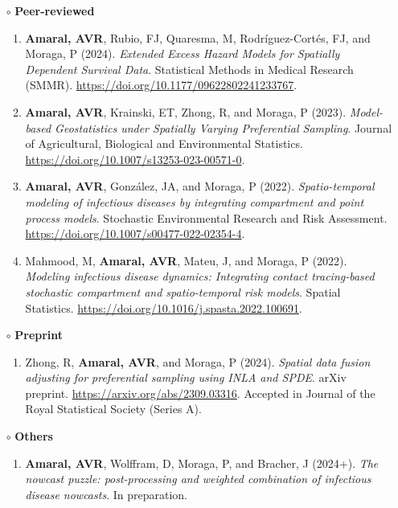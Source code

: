 \documentclass[10pt, ]{article}
\begin{document}
	\begin{itemize}[noitemsep, topsep=0pt]
		\item[$\circ$]  \textbf{Peer-reviewed}
		\begin{enumerate}[label*=\arabic*., noitemsep]
		\item  \textbf{Amaral, AVR}, Rubio, FJ, Quaresma, M, Rodríguez-Cortés, FJ, and Moraga, P (2024). \textit{Extended Excess Hazard Models for Spatially Dependent Survival Data}. Statistical Methods in Medical Research (SMMR). \href{https://doi.org/10.1177/09622802241233767}{\url{https://doi.org/10.1177/09622802241233767}}.
		\item  \textbf{Amaral, AVR}, Krainski, ET, Zhong, R, and Moraga, P (2023). \textit{Model-based Geostatistics under Spatially Varying Preferential Sampling}.  Journal of Agricultural, Biological and Environmental Statistics. \url{https://doi.org/10.1007/s13253-023-00571-0}.
		\item  \textbf{Amaral, AVR}, González, JA, and Moraga, P (2022). \textit{Spatio-temporal modeling of infectious diseases by integrating compartment and point process models}. Stochastic Environmental Research and Risk Assessment. \url{https://doi.org/10.1007/s00477-022-02354-4}.
		\item  Mahmood, M, \textbf{Amaral, AVR}, Mateu, J, and Moraga, P (2022). \textit{Modeling infectious disease dynamics: Integrating contact tracing-based stochastic compartment and spatio-temporal risk models}. Spatial Statistics. \url{https://doi.org/10.1016/j.spasta.2022.100691}.
		\end{enumerate}
		\item[$\circ$] \textbf{Preprint}
		\begin{enumerate}[label*=\arabic*., noitemsep]
			\item  Zhong, R, \textbf{Amaral, AVR}, and Moraga, P (2024).\textit{ Spatial data fusion adjusting for preferential sampling using INLA and SPDE}. arXiv preprint. \href{https://arxiv.org/abs/2309.03316}{\url{https://arxiv.org/abs/2309.03316}}. Accepted in Journal of the Royal Statistical Society (Series A).
		\end{enumerate}
		\item[$\circ$] \textbf{Others}
		\begin{enumerate}[label*=\arabic*., noitemsep]
			\item \textbf{Amaral, AVR}, Wolffram, D, Moraga, P, and Bracher, J (2024+). \textit{The nowcast puzzle: post-processing and weighted combination of infectious disease nowcasts}. In preparation.
		\end{enumerate}
	\end{itemize}
	\vspace{-2pt}
	
\end{document}
